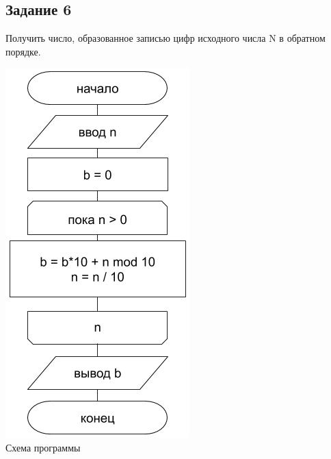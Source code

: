 \documentclass[a4paper,14pt]{extarticle}
\begin{document}
\subsection{Задание 6}
Получить число, образованное записью цифр исходного числа N в обратном порядке.
\begin{center}
\includegraphics[scale=0.6]{lab2-6.png}\\
Схема программы
\end{center}

\end{document}
